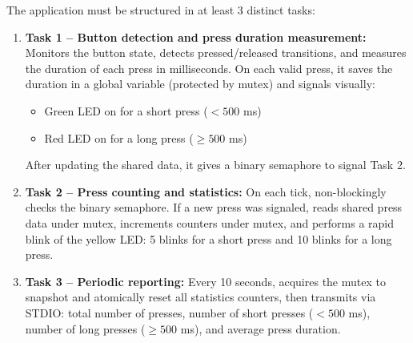 The application must be structured in at least 3 distinct tasks:

\begin{enumerate}
  \item \textbf{Task 1 -- Button detection and press duration measurement:} Monitors the button state,
    detects pressed/released transitions, and measures the duration of each press in milliseconds.
    On each valid press, it saves the duration in a global variable (protected by mutex) and signals
    visually:
    \begin{itemize}
      \item Green LED on for a short press ($< 500$ ms)
      \item Red LED on for a long press ($\geq 500$ ms)
    \end{itemize}
    After updating the shared data, it gives a binary semaphore to signal Task 2.

  \item \textbf{Task 2 -- Press counting and statistics:} On each tick, non-blockingly checks
    the binary semaphore. If a new press was signaled, reads shared press data under mutex,
    increments counters under mutex, and performs a rapid blink of the yellow LED: 5 blinks
    for a short press and 10 blinks for a long press.

  \item \textbf{Task 3 -- Periodic reporting:} Every 10 seconds, acquires the mutex to snapshot
    and atomically reset all statistics counters, then transmits via STDIO: total number of presses,
    number of short presses ($< 500$ ms), number of long presses ($\geq 500$ ms), and average
    press duration.
\end{enumerate}
